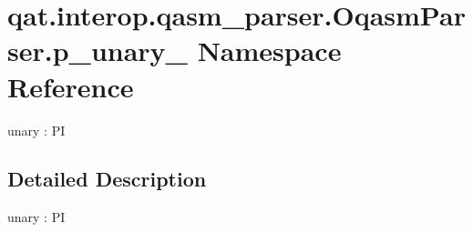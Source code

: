 \hypertarget{namespaceqat_1_1interop_1_1qasm__parser_1_1OqasmParser_1_1p__unary__2}{\section{qat.\-interop.\-qasm\-\_\-parser.\-Oqasm\-Parser.\-p\-\_\-unary\-\_ Namespace Reference}
\label{namespaceqat_1_1interop_1_1qasm__parser_1_1OqasmParser_1_1p__unary__2}
}


unary \-: P\-I  




\subsection{Detailed Description}
unary \-: P\-I 
